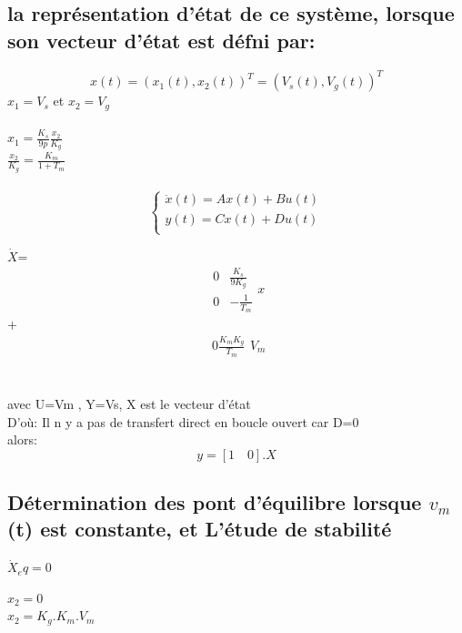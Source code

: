 \documentclass[12pt, a4paper, openany]{report}
\begin{document}
\subsection{la représentation d’état de ce système, lorsque son vecteur d’état est défni par:}


\begin{equation}
x(t)={(x_1(t),x_2(t))}^T={(V_s(t),V_g(t))}^T
\end{equation}
$x_1=V_s$ et $x_2=V_g$
\\\\


$x_1=\frac{K_s}{9p}\frac{x_2}{K_g}$\\
$\frac{x_2}{K_g}=\frac{K_m}{1+T_m}$
\\
\\

\begin{equation*}
\left\{\begin{matrix}
\dot{x}(t)=Ax(t)+Bu(t)\\ 
y(t)=Cx(t)+Du(t)\\
\end{matrix}\right.
\end{equation*}   

$\dot{X}$=$$\begin{matrix}0&\frac{K_s}{9K_g}\\0&-\frac{1}{T_m}\end{matrix}x$$
\quad+\quad $$\begin{matrix}0
\frac{K_mK_g}{T_m}
\end{matrix}V_m
$$
\\\\

avec U=Vm , Y=Vs, X est le vecteur d'état\\
D'où: Il n y a  pas de transfert direct en boucle ouvert car D=0\\
alors: $$y=[1\quad0].X$$ 



\subsection{Détermination des pont d’équilibre lorsque $v_m$(t) est constante, et L’étude de stabilité }

\begin{center}
$\dot{X}_eq=0$
\end{center}

\begin{center}
$x_2=0 $\\
$x_2=K_g.K_m.V_m$ \\
\end{center}
\end{document}
